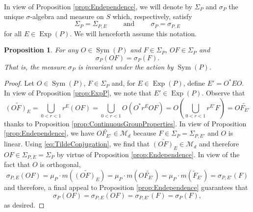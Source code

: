 \documentclass[11pt, letter]{book}
\newtheorem{proposition}[theorem]{Proposition}
\newcommand\Sym{\operatorname{Sym}}
\newcommand\Exp{\operatorname{Exp}}
\begin{document}
\noindent In view of Proposition \ref{prop:Endependence}, we will denote by $\Sigma_P$ and $\sigma_P$ the unique $\sigma$-algebra and measure on $S$ which, respectively, satisfy
\begin{equation*}
    \Sigma_P=\Sigma_{P,E}\hspace{1cm}\mbox{and}\hspace{1cm}\sigma_P=\sigma_{P,E}
\end{equation*}
for all $E\in\Exp(P)$. We will henceforth assume this notation. 


\begin{framed}
\begin{proposition}\label{prop:SymInvariance}
For any $O\in\Sym(P)$ and $F\in\Sigma_P$,  $OF\in\Sigma_P$ and
\begin{equation*}
\sigma_P(O F)=\sigma_P(F).
\end{equation*} 
That is, the measure $\sigma_P$ is invariant under the action by $\Sym(P)$.
\end{proposition}
\end{framed}


\begin{proof}
Let $O\in\Sym(P)$, $F\in\Sigma_P$ and, for $E\in \Exp(P)$, define $E'=O^* EO$. In view of Proposition \ref{prop:ExpP}, we note that $E'\in \Exp(P)$. Observe that
\begin{equation}\label{eq:TildeConjugation}
    \widetilde{(OF)_E}=\bigcup_{0<r<1}r^E (OF)=\bigcup_{0<r<1}O\left(O^* r^E O F\right)=O\left(\bigcup_{0<r<1} r^{E'}F\right)=O \widetilde{F_{E'}}
\end{equation}
thanks to Proposition \ref{prop:ContinuousGroupProperties}.
In view of Proposition \ref{prop:Endependence}, we have $O\widetilde{F_{E'}}\in \mathcal{M}_d$ because $F\in \Sigma_P=\Sigma_{P,E'}$ and $O$ is linear. Using \eqref{eq:TildeConjugation}, we find that $\widetilde{(OF)_E}\in\mathcal{M}_d$ and therefore  $OF\in\Sigma_{P,E}=\Sigma_P$ by virtue of Proposition \ref{prop:Endependence}. In view of the fact that $O$ is orthogonal,
\begin{equation*}
\sigma_{P,E}(OF)=\mu_P\cdot m\left(\widetilde{(OF)_E}\right)=\mu_P\cdot m\left(O \widetilde{F_{E'}}\right)=\mu_P\cdot m\left(\widetilde{F}_{E'}\right)=\sigma_{P,E'}(F)
\end{equation*}
and therefore, a final appeal to Proposition \ref{prop:Endependence} guarantees that
\begin{equation*}
    \sigma_P(OF)=\sigma_{P,E}(OF)=\sigma_{P,E'}(F)=\sigma_P(F),
\end{equation*}
as desired.
\end{proof}
\end{document}
